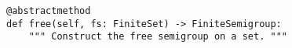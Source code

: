 \begin{verbatim}
@abstractmethod
def free(self, fs: FiniteSet) -> FiniteSemigroup:
    """ Construct the free semigroup on a set. """
\end{verbatim}